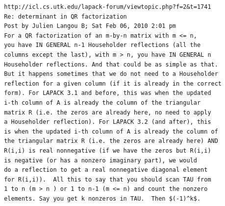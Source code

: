 \documentclass[10pt,openany,twoside]{book}
\numberwithin{equation}{section}   %
\begin{document}
\begin{lstlisting}
 http://icl.cs.utk.edu/lapack-forum/viewtopic.php?f=2&t=1741
 Re: determinant in QR factorization
 Post by Julien Langou B; Sat Feb 06, 2010 2:01 pm
 For a QR factorization of an m-by-n matrix with m <= n,
 you have IN GENERAL n-1 Householder reflections (all the
 columns except the last), with m > n, you have IN GENERAL n
 Householder reflections. And that could be as simple as that.
 But it happens sometimes that we do not need to a Householder
 reflection for a given column (if it is already in the correct
 form). For LAPACK 3.1 and before, this was when the updated
 i-th column of A is already the column of the triangular
 matrix R (i.e. the zeros are already here, no need to apply
 a Householder reflection). For LAPACK 3.2 (and after), this
 is when the updated i-th column of A is already the column of
 the triangular matrix R (i.e. the zeros are already here) AND
 R(i,i) is real nonnegative (if we have the zeros but R(i,i)
 is negative (or has a nonzero imaginary part), we would
 do a reflection to get a real nonnegative diagonal element
 for R(i,i)).  All this to say that you should scan TAU from
 1 to n (m > n ) or 1 to n-1 (m <= n) and count the nonzero
 elements. Say you get k nonzeros in TAU.  Then $(-1)^k$.
\end{lstlisting}
\end{document}
